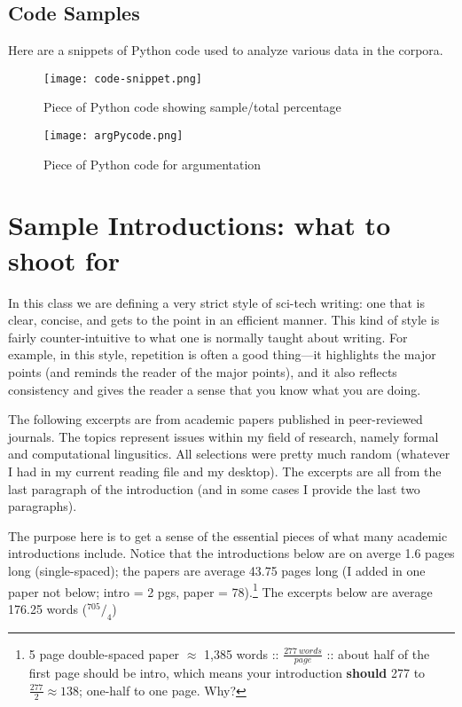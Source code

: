 \documentclass{article}
\begin{document}
\newpage
\subsection{Code Samples}
Here are a snippets of Python code used to analyze various data in the corpora.
\begin{figure}[!h]
\texttt{[image: code-snippet.png]}
\caption{Piece of Python code showing sample/total percentage}
\end{figure}

\begin{figure}[!h]
\texttt{[image: argPycode.png]}
\caption{Piece of Python code for argumentation}
\end{figure}





\newpage
\section{Sample Introductions: what to shoot for}
In this class we are defining a very strict style of sci-tech writing: one that is clear, concise, and gets to the point in an efficient manner. This kind of style is fairly counter-intuitive to what one is normally taught about writing. For example, in this style, repetition is often a good thing---it highlights the major points (and reminds the reader of the major points), and it also reflects consistency and gives the reader a sense that you know what you are doing.

The following excerpts are from academic papers published in peer-reviewed journals. The topics represent issues within my field of research, namely formal and computational lingusitics. All selections were pretty much random (whatever I had in my current reading file and my desktop). The excerpts are all from the last paragraph of the introduction (and in some cases I provide the last two paragraphs).

The purpose here is to get a sense of the essential pieces of what many academic introductions include. Notice that the introductions below are on averge 1.6 pages long (single-spaced); the papers are average 43.75 pages long (I added in one paper not below; intro = 2 pgs, paper = 78).\footnote{5 page double-spaced paper $\approx$ 1,385 words ::  $\frac{277 \ words}{page}$ :: about half of the first page should be intro, which means your introduction \textbf{should} 277 to $\frac{277}{2} \approx 138$; one-half to one page. Why?} The excerpts below are average 176.25 words ($^{705}/_4$) 
\end{document}
